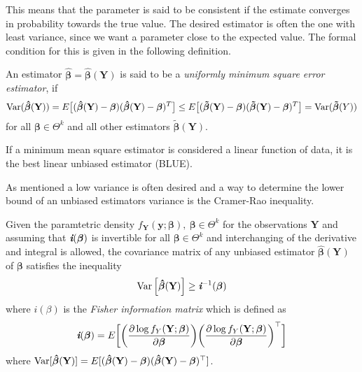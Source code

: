 This means that the parameter is said to be consistent if the estimate converges in probability towards the true value. 
The desired estimator is often the one with least variance, since we want a parameter close to the expected value. The formal condition for this is given in the following definition.

\begin{definition} 
\label{def:minimum_mean_square_error}
An estimator $\boldsymbol{\hat{\beta}}=\boldsymbol{\hat{\beta}}(\textbf{Y})$ is said to be a \textit{uniformly minimum square error estimator}, if
\begin{align*}
    \operatorname{\text{Var}}(\boldsymbol{\hat{\beta}}(\textbf{Y})) = E\big[ (\boldsymbol{\hat{\beta}}(\textbf{Y})-\boldsymbol{\beta})(\boldsymbol{\hat{\beta}}(\textbf{Y})-\boldsymbol{\beta})^T \big] \leq E\big[ (\boldsymbol{\tilde{\beta}}(\textbf{Y})-\boldsymbol{\beta})(\boldsymbol{\tilde{\beta}}(\textbf{Y})-\boldsymbol{\beta})^T \big] = \operatorname{\text{Var}}(\boldsymbol{\tilde{\beta}}(Y))
\end{align*} 
for all $\boldsymbol{\beta} \in \Theta^k $ and all other estimators $\boldsymbol{\tilde{\beta}(\textbf{Y})}$.
 \end{definition}
 
If a minimum mean square estimator is considered a linear function of data, it is the best linear unbiased estimator (BLUE).

As mentioned a low variance is often desired and a way to determine the lower bound of an unbiased estimators variance is the Cramer-Rao inequality.
 
 \begin{theorem} 
\label{th:cramerrao_inequality}
Given the paramtetric density $f_{\textbf{Y}}(\textbf{y};\boldsymbol{\beta}), \ \boldsymbol{\beta} \in \Theta^k$ for the observations $\textbf{Y}$ and assuming that $\textit{\textbf{i}}(\boldsymbol{\beta})$ is invertible for all $\boldsymbol{\beta} \in \Theta^k$ and interchanging of the derivative and integral is allowed, the covariance matrix of any unbiased estimator $\boldsymbol{\hat{\beta}}(\textbf{Y})$ of $\boldsymbol{\beta}$ satisfies the inequality
\begin{align} \label{eq:cramerrao_inequality}
    \operatorname{\text{Var}} \Big[ \boldsymbol{\hat{\beta}}(\textbf{Y})\Big] \geq \textit{\textbf{i}}^{-1}(\boldsymbol{\beta})
\end{align}
where $\textit{i}(\beta)$ is the \textit{Fisher information matrix} which is defined as
\begin{align*}
    \textit{\textbf{i}}(\boldsymbol{\beta})=E \bigg[ \bigg(\frac{\partial \log f_Y(\textbf{Y};\boldsymbol{\beta})}{\partial \boldsymbol{\beta}} \bigg)\bigg(\frac{\partial \log f_Y(\textbf{Y};\boldsymbol{\beta})}{\partial \boldsymbol{\beta}}\bigg)^\top\bigg]
\end{align*}
where $\operatorname{\text{Var}} [\boldsymbol{\hat{\beta}}(\textbf{Y})]=E[(\boldsymbol{\hat{\beta}}(\textbf{Y})-\boldsymbol{\beta})(\boldsymbol{\hat{\beta}}(\textbf{Y})-\boldsymbol{\beta})^\top]$.
\end{theorem}

